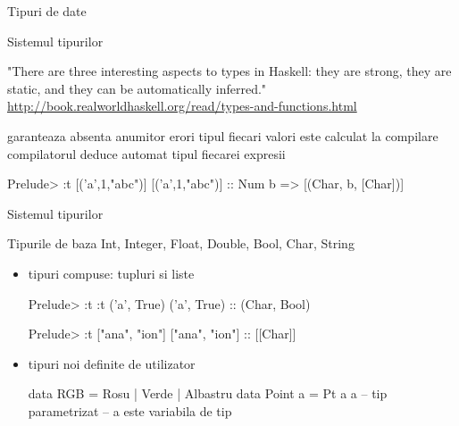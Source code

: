 \documentclass[xcolor=pdftex,romanian,colorlinks]{beamer}
\begin{document}
\begin{section}{Tipuri de date}

\begin{frame}[fragile]{Sistemul tipurilor}
\begin{block}{}
"There are three interesting aspects to types in Haskell:
 they are strong, they are static, and they can be automatically inferred."\\
\small{\url{http://book.realworldhaskell.org/read/types-and-functions.html}}
\end{block}
\begin{description}
\vitem[tare]  garanteaza absenta anumitor erori
\vitem[static] tipul fiecari valori este calculat la compilare
 compilatorul deduce automat tipul fiecarei expresii

\begin{asciihs}
Prelude> :t [('a',1,"abc")]
[('a',1,"abc")] :: Num b => [(Char, b, [Char])]
\end{asciihs}

\end{description}

\end{frame}

\begin{frame}[fragile]{Sistemul tipurilor}
\begin{block}{Tipurile de baza}
Int, Integer, Float, Double, Bool, Char, String
\end{block}

\pause
\begin{itemize}
\item tipuri compuse: tupluri si liste
\begin{asciihs}
Prelude> :t :t ('a', True)
('a', True) :: (Char, Bool)

Prelude> :t ["ana", "ion"]
["ana", "ion"] :: [[Char]]
\end{asciihs}
\pause
\item tipuri noi definite de utilizator
\begin{asciihs}
data RGB = Rosu | Verde | Albastru
data Point a = Pt a a    -- tip parametrizat
                         -- a este variabila de tip
\end{asciihs}
\end{itemize}
\end{frame}






\end{section}
\end{document}
